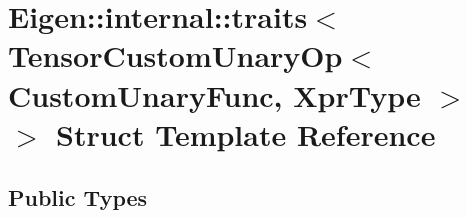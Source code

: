 \hypertarget{struct_eigen_1_1internal_1_1traits_3_01_tensor_custom_unary_op_3_01_custom_unary_func_00_01_xpr_type_01_4_01_4}{}\section{Eigen\+:\+:internal\+:\+:traits$<$ Tensor\+Custom\+Unary\+Op$<$ Custom\+Unary\+Func, Xpr\+Type $>$ $>$ Struct Template Reference}
\label{struct_eigen_1_1internal_1_1traits_3_01_tensor_custom_unary_op_3_01_custom_unary_func_00_01_xpr_type_01_4_01_4}
\subsection*{Public Types}
